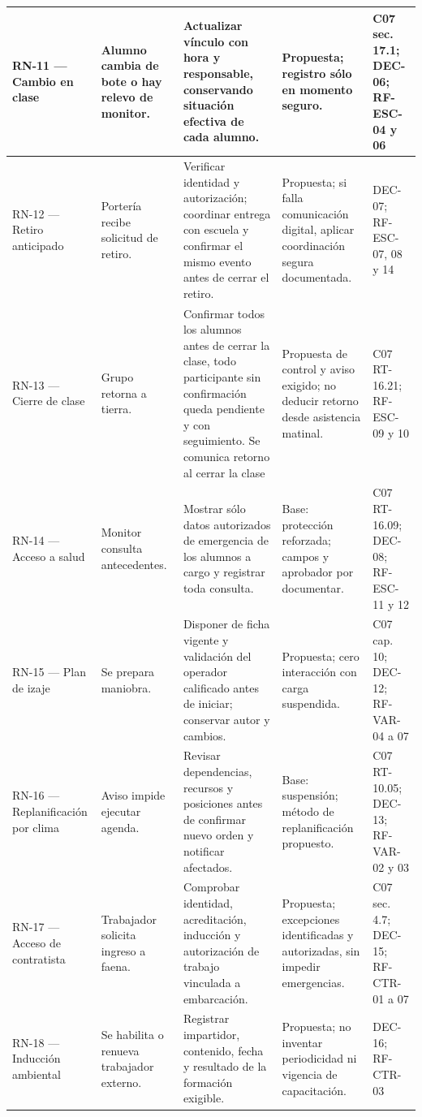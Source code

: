 \begin{longtable}{|L{0.116466\AnchoTablaAnexo}|L{0.160643\AnchoTablaAnexo}|L{0.325301\AnchoTablaAnexo}|L{0.257028\AnchoTablaAnexo}|L{0.140562\AnchoTablaAnexo}|}
RN-11 — Cambio en clase & Alumno cambia de bote o hay relevo de monitor. & Actualizar vínculo con hora y responsable, conservando situación efectiva de cada alumno. & Propuesta; registro sólo en momento seguro. & C07 sec. 17.1; DEC-06; RF-ESC-04 y 06 \\ \hline
RN-12 — Retiro anticipado & Portería recibe solicitud de retiro. & Verificar identidad y autorización; coordinar entrega con escuela y confirmar el mismo evento antes de cerrar el retiro. & Propuesta; si falla comunicación digital, aplicar coordinación segura documentada. & DEC-07; RF-ESC-07, 08 y 14 \\ \hline
{}
RN-13 — Cierre de clase & Grupo retorna a tierra. & Confirmar todos los alumnos antes de cerrar la clase, todo participante sin confirmación queda pendiente y con seguimiento. Se comunica retorno al cerrar la clase & Propuesta de control y aviso exigido; no deducir retorno desde asistencia matinal. & C07 RT-16.21; RF-ESC-09 y 10 \\ \hline
RN-14 — Acceso a salud & Monitor consulta antecedentes. & Mostrar sólo datos autorizados de emergencia de los alumnos a cargo y registrar toda consulta. & Base: protección reforzada; campos y aprobador por documentar. & C07 RT-16.09; DEC-08; RF-ESC-11 y 12 \\ \hline
{}
RN-15 — Plan de izaje & Se prepara maniobra. & Disponer de ficha vigente y validación del operador calificado antes de iniciar; conservar autor y cambios. & Propuesta; cero interacción con carga suspendida. & C07 cap. 10; DEC-12; RF-VAR-04 a 07 \\ \hline
RN-16 — Replanificación por clima & Aviso impide ejecutar agenda. & Revisar dependencias, recursos y posiciones antes de confirmar nuevo orden y notificar afectados. & Base: suspensión; método de replanificación propuesto. & C07 RT-10.05; DEC-13; RF-VAR-02 y 03 \\ \hline
{}
RN-17 — Acceso de contratista & Trabajador solicita ingreso a faena. & Comprobar identidad, acreditación, inducción y autorización de trabajo vinculada a embarcación. & Propuesta; excepciones identificadas y autorizadas, sin impedir emergencias. & C07 sec. 4.7; DEC-15; RF-CTR-01 a 07 \\ \hline
RN-18 — Inducción ambiental & Se habilita o renueva trabajador externo. & Registrar impartidor, contenido, fecha y resultado de la formación exigible. & Propuesta; no inventar periodicidad ni vigencia de capacitación. & DEC-16; RF-CTR-03 \\ \hline

\end{longtable}
